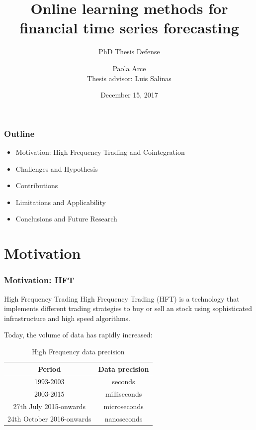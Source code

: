 \documentclass{beamer}
\author[Paola Arce]{Paola Arce \\ Thesis advisor: Luis Salinas}
\date{December 15, 2017}
\title[Thesis defense]{Online learning methods for financial time series forecasting}
\subtitle{PhD Thesis Defense}
\begin{document}
\begin{frame}[plain]
\titlepage
{}

\end{frame}

\begin{frame}
\frametitle{Outline}
\begin{itemize}
\item Motivation: High Frequency Trading and Cointegration
\item Challenges and Hypothesis
\item Contributions
\item Limitations and Applicability
\item Conclusions and Future Research
\end{itemize}
\end{frame}

\section{Motivation}


\begin{frame}
\frametitle{Motivation: HFT}
\begin{block}{High Frequency Trading}
High Frequency Trading (HFT) is a technology that implements different trading strategies to buy or sell an stock using sophisticated infrastructure and high speed algorithms.
\end{block}

Today, the volume of data has rapidly increased:

\begin{table}
\begin{tabular}{ c | c }
Period & Data precision \\
\hline \hline
1993-2003 & seconds \\
2003-2015 & milliseconds \\
27th July 2015-onwards & microseconds \\
24th October 2016-onwards & nanoseconds
\end{tabular}
\caption{High Frequency data precision}
\end{table}

\end{frame}
\end{document}
